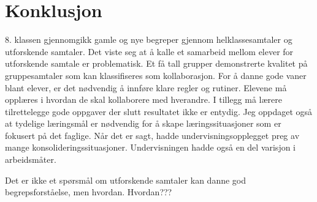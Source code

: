 \documentclass[main.tex]{subfiles}
\begin{document}
\section*{Konklusjon}
\label{sec:4}

8. klassen gjennomgikk gamle og nye begreper gjennom helklassesamtaler og utforskende 
samtaler. Det viste seg at å kalle et samarbeid mellom elever for utforskende samtale
er problematisk. Et få tall grupper demonstrerte kvalitet på gruppesamtaler som kan
klassifiseres som kollaborasjon. For å danne gode vaner blant elever, er det nødvendig 
å innføre klare regler og rutiner. Elevene må opplæres i hvordan de skal kollaborere 
med hverandre. I tillegg må lærere tilrettelegge gode oppgaver der slutt resultatet 
ikke er entydig. Jeg oppdaget også at tydelige læringsmål er nødvendig for å skape 
læringssituasjoner som er fokusert på det faglige. Når det er sagt, hadde 
undervisningsopplegget preg av mange konsolideringssituasjoner. Undervisningen hadde 
også en del varisjon i arbeidsmåter. 

Det er ikke et spørsmål om utforskende samtaler kan danne god begrepsforståelse, men 
hvordan. Hvordan???
\end{document}
